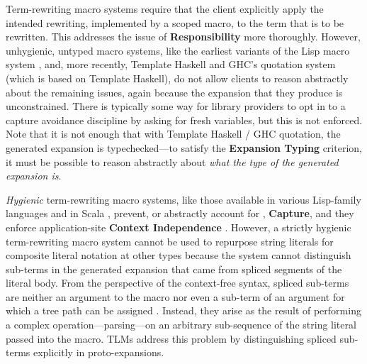 \documentclass[acmsmall,screen]{acmart}
\begin{document}
Term-rewriting macro systems require that the client explicitly apply the intended rewriting, implemented by a scoped macro, to the term that is to be rewritten. This addresses the issue of \textbf{Responsibility} more thoroughly. However, unhygienic, untyped macro systems, like the earliest variants of the Lisp macro system \cite{Hart63a}, and, more recently, Template Haskell \cite{SheardPeytonJones:Haskell-02} and GHC's quotation system \cite{mainland2007s} (which is based on Template Haskell), do not allow clients to reason abstractly about the remaining issues, again because the expansion that they produce is unconstrained. There is typically some way for library providers to opt in to a capture avoidance discipline by asking for fresh variables, but this is not enforced. Note that it is not enough that with Template Haskell / GHC quotation, the generated expansion is typechecked---to satisfy the \textbf{Expansion Typing} criterion, it must be possible to reason abstractly about \emph{what the type of the generated expansion is}. 


\emph{Hygienic} term-rewriting macro systems, like those available in various Lisp-family languages \cite{mccarthy1978history} and in Scala \cite{ScalaMacros2013}, prevent, or abstractly account for \cite{DBLP:conf/esop/HermanW08,Herman10:Theory}, \textbf{Capture}, and they enforce application-site \textbf{Context Independence} \cite{Kohlbecker86a,DBLP:conf/popl/Adams15,DBLP:conf/popl/ClingerR91,DBLP:journals/lisp/DybvigHB92}. However, a strictly hygienic term-rewriting macro system cannot be used to repurpose string literals for composite literal notation at other types because the system cannot distinguish  sub-terms in the generated expansion that came from spliced segments of the literal body. From the perspective of the context-free syntax, spliced sub-terms are neither an argument to the macro nor even a sub-term of an argument for which a tree path can be assigned \cite{DBLP:conf/esop/HermanW08,Herman10:Theory,gorn1965explicit}. Instead, they arise as the result of performing a complex operation---parsing---on an arbitrary sub-sequence of the string literal passed into the macro. TLMs address this problem by distinguishing spliced sub-terms explicitly in proto-expansions.
\end{document}
